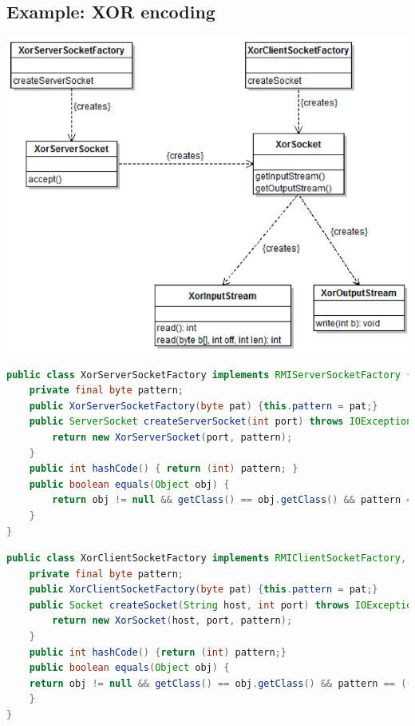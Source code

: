 \documentclass[10pt]{article}
\begin{document}
\subsection{Example: XOR encoding}
\begin{center}
	\includegraphics[scale=0.3]{images/rmi-factory.png}
\end{center}
\begin{lstlisting}[language=Java, caption=XorServerSocketFactory, style=JavaStyle]
public class XorServerSocketFactory implements RMIServerSocketFactory {
	private final byte pattern;
	public XorServerSocketFactory(byte pat) {this.pattern = pat;}
	public ServerSocket createServerSocket(int port) throws IOException {
		return new XorServerSocket(port, pattern);
	}
	public int hashCode() { return (int) pattern; }
	public boolean equals(Object obj) {
		return obj != null && getClass() == obj.getClass() && pattern == ((XorServerSocketFactory)obj).pattern);
	}
}
\end{lstlisting}
\begin{lstlisting}[language=Java, caption=XorClientSocketFactory, style=JavaStyle]
public class XorClientSocketFactory implements RMIClientSocketFactory, Serializable {
	private final byte pattern;
	public XorClientSocketFactory(byte pat) {this.pattern = pat;}
	public Socket createSocket(String host, int port) throws IOException {
		return new XorSocket(host, port, pattern);
	}
	public int hashCode() {return (int) pattern;}
	public boolean equals(Object obj) {
	return obj != null && getClass() == obj.getClass() && pattern == ((XorClientSocketFactory) obj).pattern;
	}
}
\end{lstlisting}
\end{document}
